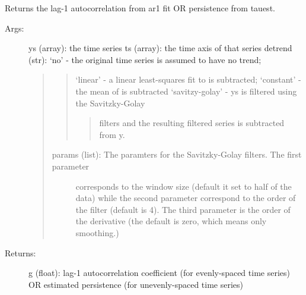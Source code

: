 \documentclass[letterpaper,10pt,english]{sphinxmanual}
\begin{document}
\begin{fulllineitems}
\label{\detokenize{Spectral:pyleoclim.Spectral.ar1_fit}}
Returns the lag-1 autocorrelation from ar1 fit OR persistence from tauest.
\begin{description}
\item[{Args:}] \leavevmode
ys (array): the time series
ts (array): the time axis of that series
detrend (str): ‘no’ - the original time series is assumed to have no trend;
\begin{quote}
\begin{quote}

‘linear’ - a linear least-squares fit to  is subtracted;
‘constant’ - the mean of  is subtracted
‘savitzy-golay’ - ys is filtered using the Savitzky-Golay
\begin{quote}

filters and the resulting filtered series is subtracted from y.
\end{quote}
\end{quote}
\begin{description}
\item[{params (list): The paramters for the Savitzky-Golay filters. The first parameter}] \leavevmode
corresponds to the window size (default it set to half of the data)
while the second parameter correspond to the order of the filter
(default is 4). The third parameter is the order of the derivative
(the default is zero, which means only smoothing.)

\end{description}
\end{quote}

\item[{Returns:}] \leavevmode
g (float): lag-1 autocorrelation coefficient (for evenly-spaced time series)
OR estimated persistence (for unevenly-spaced time series)

\end{description}

\end{fulllineitems}

\end{document}
